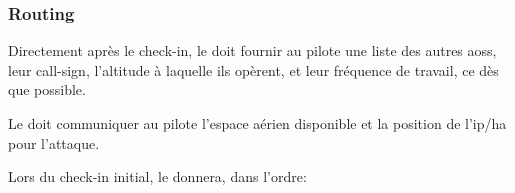 
\subsubsection{Routing}

Directement après le check-in, le \ja{} doit fournir au pilote une liste des autres \glspl{aos}, leur call-sign, l'altitude à laquelle ils opèrent, et leur fréquence de travail, ce dès que possible.

Le \ja{} doit communiquer au pilote l'espace aérien disponible et la position de l'\gls{ip}/\gls{ha} pour l'attaque.

Lors du check-in initial, le \ja{} donnera, dans l'ordre:

